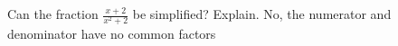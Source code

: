 {Can the fraction $\displaystyle \frac{x+2}{x^2+2}$ be simplified? Explain.}
{No, the numerator and denominator have no common factors}
